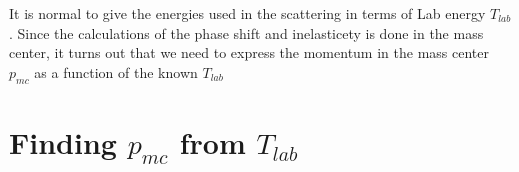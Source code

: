 \label{chap:relativistic} 

It is normal to give the energies used in the scattering in terms of Lab energy $T_{lab}$. Since the 
calculations of the phase shift and inelasticety is done in the mass center, it turns out that we need
to express the momentum in the mass center $p_{mc}$ as a function of the known $T_{lab}$
\nl
\nl
\section{Finding $p_{mc}$ from $T_{lab}$}

